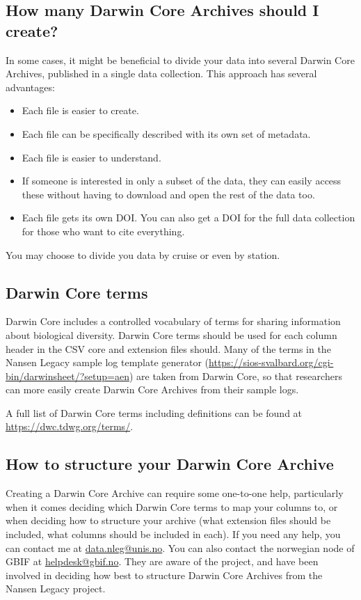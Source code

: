 \documentclass[a4paper,english, 11pt]{article}
\makeatletter
\newcommand{\emailme}{\href{mailto:data.nleg@unis.no}{data.nleg@unis.no}}
\makeatother
\begin{document}
\subsection{How many Darwin Core Archives should I create?}\label{ss:dwcacollection}

In some cases, it might be beneficial to divide your data into several Darwin Core Archives, published in a single data collection. This approach has several advantages:

\begin{itemize}
\item Each file is easier to create.
\item Each file can be specifically described with its own set of metadata.
\item Each file is easier to understand.
\item If someone is interested in only a subset of the data, they can easily access these without having to download and open the rest of the data too.
\item Each file gets its own DOI. You can also get a DOI for the full data collection for those who want to cite everything.
\end{itemize}   

You may choose to divide you data by cruise or even by station.

\subsection{Darwin Core terms}
\label{ss:dwcterms}

Darwin Core includes a controlled vocabulary of terms for sharing information about biological diversity. Darwin Core terms should be used for each column header in the CSV core and extension files should. Many of the terms in the Nansen Legacy sample log template generator (\url{https://sios-svalbard.org/cgi-bin/darwinsheet/?setup=aen}) are taken from Darwin Core, so that researchers can more easily create Darwin Core Archives from their sample logs.

A full list of Darwin Core terms including definitions can be found at \url{https://dwc.tdwg.org/terms/}.

\subsection{How to structure your Darwin Core Archive}
\label{ss:structuredwca}

Creating a Darwin Core Archive can require some one-to-one help, particularly when it comes deciding which Darwin Core terms to map your columns to, or when deciding how to structure your archive (what extension files should be included, what columns should be included in each). If you need any help, you can contact me at \emailme. You can also contact the norwegian node of GBIF at \href{mailto:helpdesk@gbif.no}{helpdesk@gbif.no}. They are aware of the project, and have been involved in deciding how best to structure Darwin Core Archives from the Nansen Legacy project.
\end{document}
